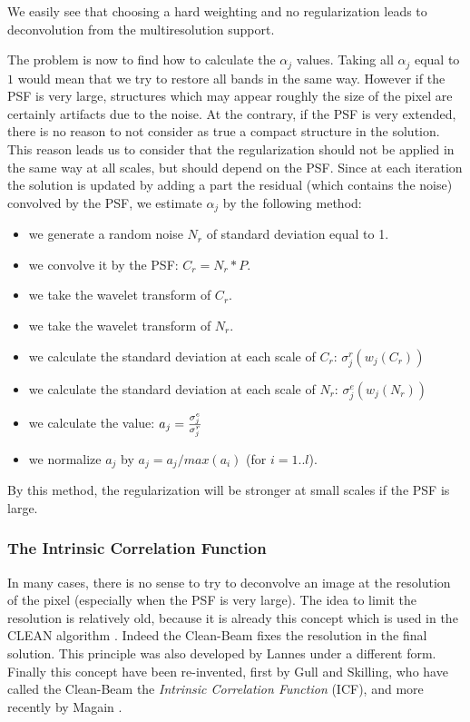 We easily see that choosing a hard weighting and no regularization leads 
to deconvolution from the multiresolution support.

The problem is now to find how to calculate the $\alpha_j$ values. Taking
all $\alpha_j$ equal to $1$ would mean that we try to restore all bands
in the same way. However if the PSF is very large, structures which may 
appear roughly the size of the pixel are certainly artifacts due to the noise.
At the contrary, if the PSF is very extended, there is no reason to not
consider as true a compact structure in the solution. This reason leads
us
to consider that the regularization should not be applied in the same way
at all scales, but should depend on the PSF. Since at each iteration the
solution is updated by adding a part the residual (which contains the noise)
convolved by the PSF, we estimate $\alpha_j$ by the following method:
\begin{itemize}
\item we generate a random noise $N_r$ of standard deviation equal to 1.
\item we convolve it by the PSF: $C_r = N_r * P$.
\item we take the wavelet transform of $C_r$.
\item we take the wavelet transform of $N_r$.
\item we calculate the standard deviation at each scale of $C_r$: $\sigma^r_j (w_j(C_r))$
\item we calculate the standard deviation at each scale of $N_r$: $\sigma^e_j (w_j(N_r))$
\item we calculate the value: $a_j =  {\sigma_j^e \over  \sigma^r_j}$
\item we normalize $a_j$ by $a_j = a_j / max(a_i)$ (for $i=1..l$).
\end{itemize}
By this method, the regularization will be
stronger at small scales if the PSF is large.

\subsubsection{The Intrinsic Correlation Function}
In many cases, there is no sense to try to deconvolve an image at the resolution
of the pixel (especially when the PSF is very large). The idea to limit the 
resolution is relatively old, because it is already this concept which 
is used in the CLEAN algorithm \cite{rest:hogbom74}. Indeed the Clean-Beam
fixes the resolution in the final solution. This principle was also 
developed by Lannes \cite{rest:lannes87} under a different form. 
Finally this concept have been re-invented,  first by
Gull and Skilling, who have called the Clean-Beam 
the {\em Intrinsic Correlation Function} (ICF), and more recently by
Magain \cite{rest:magain98}. 

